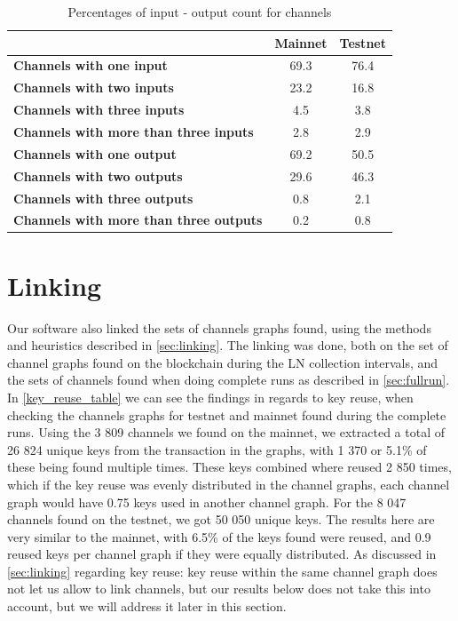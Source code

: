 \begin{table}[ht]
\centering
\caption{Percentages of input - output count for channels}
\label{channel_input_output}
\begin{tabular}{l|c|c}
                                                                      & \textbf{Mainnet} & \textbf{Testnet} \\ \hline
\textbf{Channels with one input}             & 69.3            & 76.4            \\ \hline
\textbf{Channels with two inputs}            & 23.2            & 16.8            \\ \hline
\textbf{Channels with three inputs}          & 4.5             & 3.8             \\ \hline
\textbf{Channels with more than three inputs} & 2.8             & 2.9             \\ \hline
\textbf{Channels with one output}             & 69.2            & 50.5            \\ \hline
\textbf{Channels with two outputs}             & 29.6            & 46.3            \\ \hline
\textbf{Channels with three outputs}            & 0.8             & 2.1             \\ \hline
\textbf{Channels with more than three outputs} & 0.2             & 0.8             \\ \hline
\end{tabular}
\end{table}

\section{Linking}

Our software also linked the sets of channels graphs found, using the methods and heuristics described in \cref{sec:linking}.
The linking was done, both on the set of channel graphs found on the blockchain during the LN collection intervals, and the sets of channels found when doing complete runs as described in \cref{sec:fullrun}. In \cref{key_reuse_table} we can see the findings in regards to key reuse, when checking the channels graphs for testnet and mainnet found during the complete runs. Using the 3 809 channels we found on the mainnet, we extracted a total of 26 824 unique keys from the transaction in the graphs, with 1 370 or 5.1\% of these being found multiple times. These keys combined where reused 2 850 times, which if the key reuse was evenly distributed in the channel graphs, each channel graph would have 0.75 keys used in another channel graph. For the 8 047 channels found on the testnet, we got 50 050 unique keys. The results here are very similar to the mainnet, with 6.5\% of the keys found were reused, and 0.9 reused keys per channel graph if they were equally distributed. As discussed in \cref{sec:linking} regarding key reuse: key reuse within the same channel graph does not let us allow to link channels, but our results below does not take this into account, but we will address it later in this section.
\\


